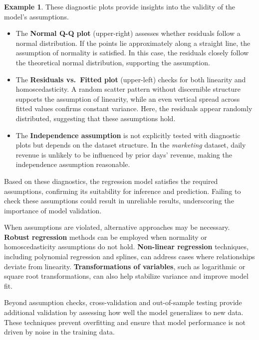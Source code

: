 \documentclass[
]{book}
\providecommand{\tightlist}{%
  \setlength{\itemsep}{0pt}\setlength{\parskip}{0pt}}
\theoremstyle{definition}
\theoremstyle{definition}
\newtheorem{example}{Example}[chapter]
\theoremstyle{definition}
\theoremstyle{definition}
\theoremstyle{remark}
\begin{document}
\begin{example}
These diagnostic plots provide insights into the validity of the model's assumptions.

\begin{itemize}
\tightlist
\item
  The \textbf{Normal Q-Q plot} (upper-right) assesses whether residuals follow a normal distribution. If the points lie approximately along a straight line, the assumption of normality is satisfied. In this case, the residuals closely follow the theoretical normal distribution, supporting the assumption.\\
\item
  The \textbf{Residuals vs.~Fitted plot} (upper-left) checks for both linearity and homoscedasticity. A random scatter pattern without discernible structure supports the assumption of linearity, while an even vertical spread across fitted values confirms constant variance. Here, the residuals appear randomly distributed, suggesting that these assumptions hold.\\
\item
  The \textbf{Independence assumption} is not explicitly tested with diagnostic plots but depends on the dataset structure. In the \emph{marketing} dataset, daily revenue is unlikely to be influenced by prior days' revenue, making the independence assumption reasonable.
\end{itemize}

Based on these diagnostics, the regression model satisfies the required assumptions, confirming its suitability for inference and prediction. Failing to check these assumptions could result in unreliable results, underscoring the importance of model validation.
\end{example}

When assumptions are violated, alternative approaches may be necessary. \textbf{Robust regression} methods can be employed when normality or homoscedasticity assumptions do not hold. \textbf{Non-linear regression} techniques, including polynomial regression and splines, can address cases where relationships deviate from linearity. \textbf{Transformations of variables}, such as logarithmic or square root transformations, can also help stabilize variance and improve model fit.

Beyond assumption checks, cross-validation and out-of-sample testing provide additional validation by assessing how well the model generalizes to new data. These techniques prevent overfitting and ensure that model performance is not driven by noise in the training data.
\end{document}
